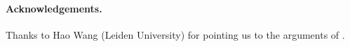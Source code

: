 \documentclass[runningheads]{llncs}
\begin{document}
\paragraph*{Acknowledgements.}

Thanks to Hao Wang (Leiden University) for pointing us to the arguments of
\citet{EriPeaGar2019scalable}.




\renewcommand{\doi}[1]{doi:\hspace{.16667em plus .08333em}\discretionary{}{}{}\href{https://doi.org/#1}{\urlstyle{rm}\nolinkurl{#1}}}


\end{document}
